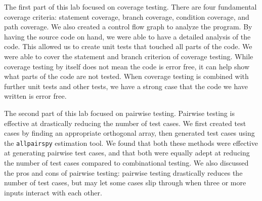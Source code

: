 \documentclass[12pt, letterpaper, titlepage]{article}
\begin{document}
The first part of this lab focused on coverage testing. There are four fundamental coverage criteria: statement coverage, branch coverage, condition coverage, and path coverage. We also created a control flow graph to analyze the program. By having the source code on hand, we were able to have a detailed analysis of the code. This allowed us to create unit tests that touched all parts of the code. We were able to cover the statement and branch criterion of coverage testing. While coverage testing by itself does not mean the code is error free, it can help show what parts of the code are not tested. When coverage testing is combined with further unit tests and other tests, we have a strong case that the code we have written is error free.

The second part of this lab focused on pairwise testing. Pairwise testing is effective at drastically reducing the number of test cases. We first created test cases by finding an appropriate orthogonal array, then generated test cases using the \lstinline{allpairspy} estimation tool. We found that both these methods were effective at generating pairwise test cases, and that both were equally adept at reducing the number of test cases compared to combinational testing. We also discussed the pros and cons of pairwise testing: pairwise testing drastically reduces the number of test cases, but may let some cases slip through when three or more inputs interact with each other.
\end{document}
